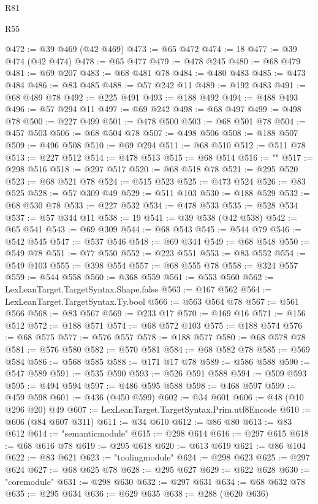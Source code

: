 \begin{lexlean}{R81}
\begin{lexlean}{R55}
\begin{coremodule}
{{{{{{{{{{{{{{{{{{{{{{{{{{{{{{{{{{{{{{{{{{{{{{{{{{{{{{{{{{{{{@472 := @39 @469 (@42 @469)
@473 := @65 @472
@474 := 18
@477 := @39 @474 (@42 @474)
@478 := @65 @477
@479 := @478 @245
@480 := @68 @479
@481 := @69 @207
@483 := @68 @481 @78
@484 := @480 @483
@485 := @473 @484
@486 := @83 @485
@488 := @57 @242 @11
@489 := @192 @483
@491 := @68 @489 @78
@492 := @225 @491
@493 := @188 @492
@494 := @488 @493
@496 := @57 @294 @11
@497 := @69 @242
@498 := @68 @497
@499 := @498 @78
@500 := @227 @499
@501 := @478 @500
@503 := @68 @501 @78
@504 := @457 @503
@506 := @68 @504 @78
@507 := @498 @506
@508 := @188 @507
@509 := @496 @508
@510 := @69 @294
@511 := @68 @510
@512 := @511 @78
@513 := @227 @512
@514 := @478 @513
@515 := @68 @514
@516 := "{"
@517 := @298 @516
@518 := @297 @517
@520 := @68 @518 @78
@521 := @295 @520
@523 := @68 @521 @78
@524 := @515 @523
@525 := @473 @524
@526 := @83 @525
@528 := @57 @309 @49
@529 := @511 @103
@530 := @188 @529
@532 := @68 @530 @78
@533 := @227 @532
@534 := @478 @533
@535 := @528 @534
@537 := @57 @344 @11
@538 := 19
@541 := @39 @538 (@42 @538)
@542 := @65 @541
@543 := @69 @309
@544 := @68 @543
@545 := @544 @79
@546 := @542 @545
@547 := @537 @546
@548 := @69 @344
@549 := @68 @548
@550 := @549 @78
@551 := @77 @550
@552 := @223 @551
@553 := @83 @552
@554 := @549 @103
@555 := @398 @554
@557 := @68 @555 @78
@558 := @324 @557
@559 := @544 @558
@560 := @368 @559
@561 := @553 @560
@562 := LexLeanTarget.TargetSyntax.Shape.false
@563 := @167 @562
@564 := LexLeanTarget.TargetSyntax.Ty.bool
@566 := @563 @564 @78
@567 := @561 @566
@568 := @83 @567
@569 := @233 @17
@570 := @169 @16
@571 := @156 @512
@572 := @188 @571
@574 := @68 @572 @103
@575 := @188 @574
@576 := @68 @575
@577 := @576 @557
@578 := @188 @577
@580 := @68 @578 @78
@581 := @576 @580
@582 := @570 @581
@584 := @68 @582 @78
@585 := @569 @584
@586 := @568 @585
@588 := @171 @17 @78
@589 := @586 @588
@590 := @547 @589
@591 := @535 @590
@593 := @526 @591 @588
@594 := @509 @593
@595 := @494 @594
@597 := @486 @595 @588
@598 := @468 @597
@599 := @459 @598
@601 := @436 (@450 @599)
@602 := @34 @601
@606 := @48 (@10 @296 @20) @49
@607 := LexLeanTarget.TargetSyntax.Prim.utf8Encode
@610 := @606 (@84 @607 @311)
@611 := @34 @610
@612 := @86 @80
@613 := @83 @612
@614 := "semanticmodule"
@615 := @298 @614
@616 := @297 @615
@618 := @68 @616 @78
@619 := @295 @618
@620 := @613 @619
@621 := @86 @104
@622 := @83 @621
@623 := "toolingmodule"
@624 := @298 @623
@625 := @297 @624
@627 := @68 @625 @78
@628 := @295 @627
@629 := @622 @628
@630 := "coremodule"
@631 := @298 @630
@632 := @297 @631
@634 := @68 @632 @78
@635 := @295 @634
@636 := @629 @635
@638 := @288 (@620 @636)
}}}}}}}}}}}}}}}}}}}}}}}}}}}}}}}}}}}}}}}}}}}}}}}}}}}}}}}}}}}}}}
\end{coremodule}
\end{lexlean}
\end{lexlean}
